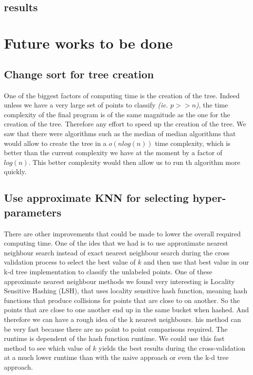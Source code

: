 \documentclass[11 pt]{article}
\begin{document}
\subsection{results}


\section{Future works to be done}

\subsection{Change sort for tree creation}
\paragraph{}One of the biggest factors of computing time is the creation of the tree. Indeed unless we have a very large set of points to classify \emph{(ie. $p>>n$)}, the time complexity of the final program is of the same magnitude as the one for the creation of the tree. Therefore any effort to speed up the creation of the tree. We saw that there were algorithms such as the median of median algorithms that would allow to create the tree in a $o(nlog(n))$ time complexity, which is better than the current complexity we have at the moment by a factor of $log(n)$. This better complexity would then allow us to run th algorithm more quickly.

\subsection{Use approximate KNN for selecting hyper-parameters}
\paragraph{}There are other improvements that could be made to lower the overall required computing time. One of the ides that we had is to use approximate nearest neighbour search instead of exact nearest neighbour search during the cross validation process to select the best value of $k$ and then use that best value in our k-d tree implementation to classify the unlabeled points. One of these approximate nearest neighbour methods we found very interesting is Locality Sensitive Hashing (LSH), that uses locality sensitive hash function, meaning hash functions that produce collisions for points that are close to on another. So the points that are close to one another end up in the same bucket when hashed. And therefore we can have a rough idea of the k nearest neighbours. his method can be very fast because there are no point to point comparisons required. The runtime is dependent of the hash function runtime. We could use this fast method to see which value of $k$ yields the best results during the cross-validation at a much lower runtime than with the naive approach or even the k-d tree approach.
\end{document}
